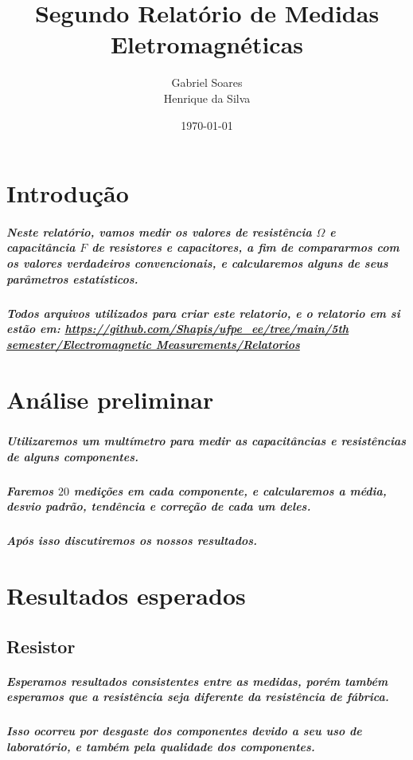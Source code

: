 \documentclass[12pt,twoside, a4paper, twocolumn]{article}
\title{Segundo Relatório  de Medidas Eletromagnéticas}
\author{Gabriel Soares \\ Henrique da Silva}
\date{\today}
\begin{document}
\maketitle
{}
\newpage
\tableofcontents
\newpage



\section{Introdução}


\subparagraph*{Neste relatório, vamos medir os valores de resistência $\varOmega$ e capacitância $F$ de resistores e capacitores, a fim de compararmos com os valores verdadeiros convencionais, e calcularemos alguns de seus parâmetros estatísticos.}

\subparagraph*{Todos arquivos utilizados para criar este relatorio, e o relatorio em si estão em:  \url{https://github.com/Shapis/ufpe_ee/tree/main/5th semester/Electromagnetic Measurements/Relatorios}}




\section{Análise preliminar}
\subparagraph*{}


\subparagraph*{Utilizaremos um multímetro para medir as capacitâncias e resistências de alguns componentes.}

\subparagraph*{Faremos $20$ medições em cada componente, e calcularemos a média, desvio padrão, tendência e correção de cada um deles.}

\subparagraph*{Após isso discutiremos os nossos resultados.}

\section{Resultados esperados}

\subsection{Resistor}

\subparagraph*{Esperamos resultados consistentes entre as medidas, porém também esperamos que a resistência seja diferente da resistência de fábrica.}

\subparagraph*{Isso ocorreu por desgaste dos componentes devido a seu uso de laboratório, e também pela qualidade dos componentes.}
\end{document}
